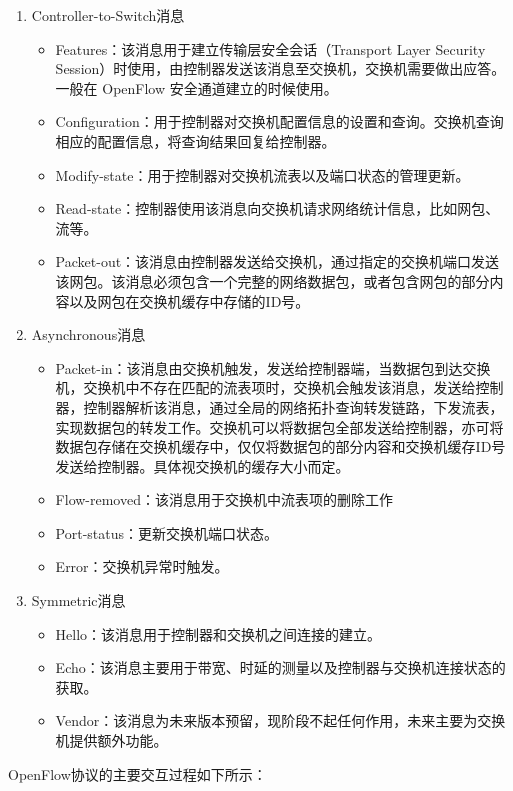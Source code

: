 \begin{enumerate}
\item Controller-to-Switch消息
\begin{itemize}
\item Features：该消息用于建立传输层安全会话（Transport Layer Security Session）时使用，由控制器发送该消息至交换机，交换机需要做出应答。一般在 OpenFlow 安全通道建立的时候使用。
\item Configuration：用于控制器对交换机配置信息的设置和查询。交换机查询相应的配置信息，将查询结果回复给控制器。
\item Modify-state：用于控制器对交换机流表以及端口状态的管理更新。
\item Read-state：控制器使用该消息向交换机请求网络统计信息，比如网包、流等。
\item Packet-out：该消息由控制器发送给交换机，通过指定的交换机端口发送该网包。该消息必须包含一个完整的网络数据包，或者包含网包的部分内容以及网包在交换机缓存中存储的ID号。 
\end{itemize}
\item Asynchronous消息
\begin{itemize}
\item Packet-in：该消息由交换机触发，发送给控制器端，当数据包到达交换机，交换机中不存在匹配的流表项时，交换机会触发该消息，发送给控制器，控制器解析该消息，通过全局的网络拓扑查询转发链路，下发流表，实现数据包的转发工作。交换机可以将数据包全部发送给控制器，亦可将数据包存储在交换机缓存中，仅仅将数据包的部分内容和交换机缓存ID号发送给控制器。具体视交换机的缓存大小而定。
\item Flow-removed：该消息用于交换机中流表项的删除工作
\item Port-status：更新交换机端口状态。
\item Error：交换机异常时触发。
\end{itemize}
\item Symmetric消息
\begin{itemize}
\item Hello：该消息用于控制器和交换机之间连接的建立。
\item Echo：该消息主要用于带宽、时延的测量以及控制器与交换机连接状态的获取。
\item Vendor：该消息为未来版本预留，现阶段不起任何作用，未来主要为交换机提供额外功能。
\end{itemize}
\end{enumerate}

OpenFlow协议的主要交互过程如下所示：

